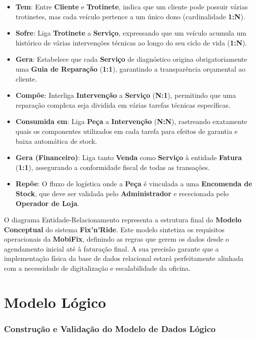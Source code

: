 \documentclass[a4paper,12pt]{scrreprt}
\begin{document}
\begin{itemize}
    \item \textbf{Tem}: Entre \textbf{Cliente} e \textbf{Trotinete}, indica que um cliente pode possuir várias trotinetes, mas cada veículo pertence a um único dono (cardinalidade \textbf{1:N}).
    \item \textbf{Sofre}: Liga \textbf{Trotinete} a \textbf{Serviço}, expressando que um veículo acumula um histórico de várias intervenções técnicas ao longo do seu ciclo de vida (\textbf{1:N}).
    \item \textbf{Gera}: Estabelece que cada \textbf{Serviço} de diagnóstico origina obrigatoriamente uma \textbf{Guia de Reparação} (\textbf{1:1}), garantindo a transparência orçamental ao cliente.
    \item \textbf{Compõe}: Interliga \textbf{Intervenção} a \textbf{Serviço} (\textbf{N:1}), permitindo que uma reparação complexa seja dividida em várias tarefas técnicas específicas.
    \item \textbf{Consumida em}: Liga \textbf{Peça} a \textbf{Intervenção} (\textbf{N:N}), rastreando exatamente quais os componentes utilizados em cada tarefa para efeitos de garantia e baixa automática de stock.
    \item \textbf{Gera (Financeiro)}: Liga tanto \textbf{Venda} como \textbf{Serviço} à entidade \textbf{Fatura} (\textbf{1:1}), assegurando a conformidade fiscal de todas as transações.
    \item \textbf{Repõe}: O fluxo de logística onde a \textbf{Peça} é vinculada a uma \textbf{Encomenda de Stock}, que deve ser validada pelo \textbf{Administrador} e rececionada pelo \textbf{Operador de Loja}.
\end{itemize}

O diagrama Entidade-Relacionamento representa a estrutura final do \textbf{Modelo Conceptual} do sistema \textbf{Fix'n'Ride}. Este modelo sintetiza os requisitos operacionais da \textbf{MobiFix}, definindo as regras que gerem os dados desde o agendamento inicial até à faturação final. A sua precisão garante que a implementação física da base de dados relacional estará perfeitamente alinhada com a necessidade de digitalização e escalabilidade da oficina. \newpage

\section{Modelo Lógico}
\subsubsection{Construção e Validação do Modelo de Dados Lógico}
\end{document}
